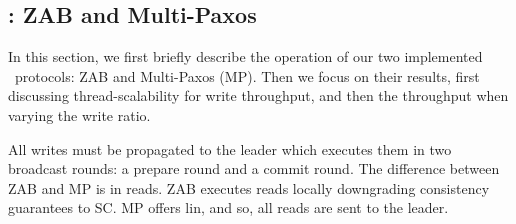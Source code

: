 \begin{comment}


\todo{I will write the part about latency, once i make another pass over the intro}
In \secref{sec:introduction}, we made a hypothesis and then based on that  a claim.
Our hypothesis was that 
there is not a strong correlation between the work-per-request ratio and the latency of the protocols. 
Our claim based on that was that the protocol designer should not try to minimize work-per-request at the expense of load balance or thread-scalability. Instead she should favour throughput in order to increase latency.

To test our hypothesis consider CP

It has the highest work-per-request ratio which includes three heavy broadcast rounds. 
However, its latency does not stand out. 
The reason is that with RDMA networking, sending a message takes only a few microseconds. 
However, the 99th percentile latency of CP at 100\% load is 216 microseconds. The dominant factor in that number is queuing. 
Queuing occurs as the request travels from buffer to buffer during its lifetime from the client thread to a worker thread, propagating to all nodes and coming back to the client. 

Now consider our claim. 
\end{comment}




% 
% 

\subsection{\LTO: ZAB and Multi-Paxos}\label{sec:ev:lto}


In this section, we first briefly describe the operation of our two implemented \LTO~protocols: ZAB and Multi-Paxos (MP). 
Then we focus on their results, first discussing thread-scalability for write throughput, and then the throughput when varying the write ratio.



All writes must be propagated to the leader which executes them in two broadcast rounds: a prepare round and a commit round.
The difference between ZAB and MP is in reads. ZAB executes reads locally downgrading consistency guarantees to SC.
MP offers lin, and so, all reads are sent to the leader.


